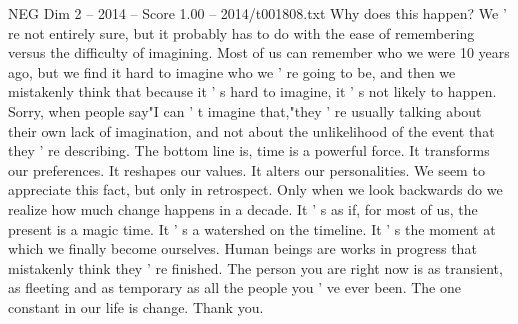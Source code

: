 \begin{textsample}{NEG Dim 2 – 2014 – Score 1.00 – 2014/t001808.txt}
Why does this happen?
We ' re not entirely sure, but it probably has to do with the ease of remembering versus the difficulty of imagining.
Most of us can remember who we were 10 years ago, but we find it hard to imagine who we ' re going to be, and then we mistakenly think that because it ' s hard to imagine, it ' s not likely to happen.
Sorry, when people say"I can ' t imagine that,"they ' re usually talking about their own lack of imagination, and not about the unlikelihood of the event that they ' re describing.
The bottom line is, time is a powerful force.
It transforms our preferences.
It reshapes our values.
It alters our personalities.
We seem to appreciate this fact, but only in retrospect.
Only when we look backwards do we realize how much change happens in a decade.
It ' s as if, for most of us, the present is a magic time.
It ' s a watershed on the timeline.
It ' s the moment at which we finally become ourselves.
Human beings are works in progress that mistakenly think they ' re finished.
The person you are right now is as transient, as fleeting and as temporary as all the people you ' ve ever been.
The one constant in our life is change.
Thank you.

\end{textsample}
